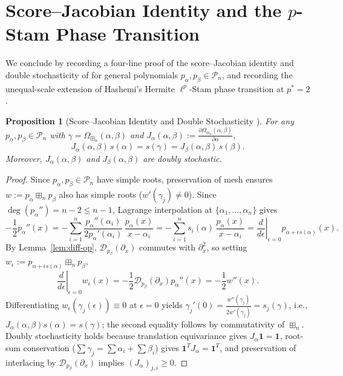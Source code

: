 \documentclass[11pt,a4paper]{article}
\newtheorem{proposition}[theorem]{Proposition}
\theoremstyle{definition}
\newcommand{\boxplusn}{\boxplus_n}
\newcommand{\one}{\mathbf{1}}
\begin{document}
\section{Score--Jacobian Identity and the \texorpdfstring{$p$}{p}-Stam Phase Transition}

We conclude by recording a four-line proof of the score--Jacobian identity and double stochasticity of \cite[Lemmas~3.2 and~3.4]{GSS2026} for general polynomials $p_\alpha, p_\beta \in \mathcal{P}_n$, and recording the unequal-scale extension of Hashemi's Hermite $\ell^p$-Stam phase transition at $p^* = 2$ \cite{Hashemi2026}.

\begin{proposition}[Score--Jacobian Identity and Double Stochasticity {\cite[Lemmas~3.2 and~3.4]{GSS2026}}]
\label{prop:score-jacobian}
For any $p_\alpha, p_\beta \in \mathcal{P}_n$ with $\gamma = \Omega_{\boxplusn}(\alpha, \beta)$ and $J_\alpha(\alpha,\beta) := \frac{\partial \Omega_{\boxplusn}(\alpha,\beta)}{\partial \alpha}$,
\[
J_\alpha(\alpha,\beta)\, s(\alpha) = s(\gamma) = J_\beta(\alpha,\beta)\, s(\beta).
\]
Moreover, $J_\alpha(\alpha,\beta)$ and $J_\beta(\alpha,\beta)$ are doubly stochastic.
\end{proposition}

\begin{proof}
Since $p_\alpha, p_\beta \in \mathcal{P}_n$ have simple roots, preservation of mesh \cite[Theorem~2.14]{GSS2026} ensures $w := p_\alpha \boxplusn p_\beta$ also has simple roots ($w'(\gamma_j) \neq 0$). Since $\deg(p_\alpha'') = n-2 \le n-1$, Lagrange interpolation at $\{\alpha_1,\dots,\alpha_n\}$ gives
\[
-\frac{1}{2} p_\alpha''(x) = -\sum_{i=1}^n \frac{p_\alpha''(\alpha_i)}{2 p_\alpha'(\alpha_i)}\,\frac{p_\alpha(x)}{x - \alpha_i} = -\sum_{i=1}^n s_i(\alpha)\,\frac{p_\alpha(x)}{x - \alpha_i} = \left.\frac{d}{d\epsilon}\right|_{\epsilon=0} p_{\alpha + \epsilon s(\alpha)}(x).
\]
By Lemma~\ref{lem:diff-op}, $\mathcal{D}_{p_\beta}(\partial_x)$ commutes with $\partial_x^2$, so setting $w_\epsilon := p_{\alpha + \epsilon s(\alpha)} \boxplusn p_\beta$,
\[
\left.\frac{d}{d\epsilon}\right|_{\epsilon=0} w_\epsilon(x) = -\frac{1}{2} \mathcal{D}_{p_\beta}(\partial_x) p_\alpha''(x) = -\frac{1}{2} w''(x).
\]
Differentiating $w_\epsilon(\gamma_j(\epsilon)) \equiv 0$ at $\epsilon = 0$ yields $\gamma_j'(0) = \frac{w''(\gamma_j)}{2 w'(\gamma_j)} = s_j(\gamma)$, i.e., $J_\alpha(\alpha,\beta) s(\alpha) = s(\gamma)$; the second equality follows by commutativity of $\boxplusn$. Doubly stochasticity holds because translation equivariance gives $J_\alpha \one = \one$, root-sum conservation ($\sum \gamma_j = \sum \alpha_i + \sum \beta_i$) gives $\one^T J_\alpha = \one^T$, and preservation of interlacing by $\mathcal{D}_{p_\beta}(\partial_x)$ \cite{MSS2022} implies $(J_\alpha)_{j,i} \ge 0$.
\end{proof}
\end{document}
